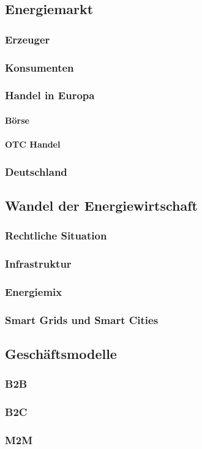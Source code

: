 \subsection{Energiemarkt}

\subsubsection{Erzeuger}

\subsubsection{Konsumenten}

\subsubsection{Handel in Europa}

\paragraph{Börse}

\paragraph{OTC Handel}

\subsubsection{Deutschland}

\subsection{Wandel der Energiewirtschaft}

\subsubsection{Rechtliche Situation}

\subsubsection{Infrastruktur}

\subsubsection{Energiemix}

\subsubsection{Smart Grids und Smart Cities}

\subsection{Geschäftsmodelle}

\subsubsection{B2B}

\subsubsection{B2C}

\subsubsection{M2M}

\newpage